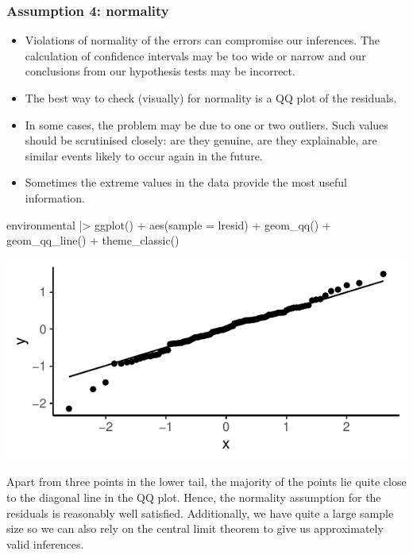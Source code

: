 \documentclass[a4paper]{article}\usepackage[]{graphicx}\usepackage[]{xcolor}
\makeatletter
\def\maxwidth{ %
  \ifdim\Gin@nat@width>\linewidth
    \linewidth
  \else
    \Gin@nat@width
  \fi
}
\makeatother
\begin{document}
\subsubsection{Assumption 4: normality}
\begin{itemize}
	\item Violations of normality of the errors can compromise our inferences. The calculation of confidence intervals may be too wide or narrow and our conclusions from our hypothesis tests may be incorrect.
	\item The best way to check (visually) for normality is a QQ plot of the residuals.
	\item In some cases, the problem may be due to one or two outliers. Such values should be scrutinised closely: are they genuine, are they explainable, are similar events likely to occur again in the future.
	\item Sometimes the extreme values in the data provide the most useful information.
\end{itemize}
\begin{Schunk}
\begin{Sinput}
environmental |> ggplot() + 
  aes(sample = lresid) +
  geom_qq() + geom_qq_line() +
  theme_classic()
\end{Sinput}


{\centering \includegraphics[width=\maxwidth]{figure/listings-unnamed-chunk-352-1} 

}

\end{Schunk}
Apart from three points in the lower tail, the majority of the points lie quite close to the diagonal line in the QQ plot. Hence, the normality assumption for the residuals is reasonably well satisfied.
Additionally, we have quite a large sample size so we can also rely on the central limit theorem to give us approximately valid inferences.
\end{document}

